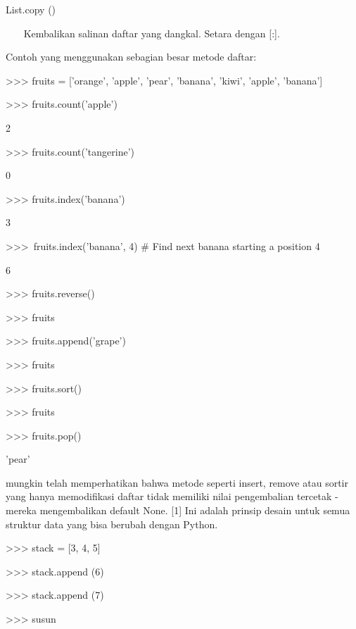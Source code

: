 \vspace{12pt}
List.copy () \par
\vspace{12pt}
~~~ Kembalikan salinan daftar yang dangkal. Setara dengan [:]. \par
\vspace{12pt}
Contoh yang menggunakan sebagian besar metode daftar: \par
\vspace{12pt}
>>> fruits = ['orange', 'apple', 'pear', 'banana', 'kiwi', 'apple', 'banana'] \par
>>> fruits.count('apple') \par
2 \par
>>> fruits.count('tangerine') \par
0 \par
>>> fruits.index('banana') \par
3 \par
>>>~fruits.index('banana', 4)   $  \#  $ Find next banana starting a position 4 \par
6 \par
>>> fruits.reverse() \par
>>> fruits \par
['banana', 'apple', 'kiwi', 'banana', 'pear', 'apple', 'orange'] \par
>>> fruits.append('grape') \par
>>> fruits \par
['banana', 'apple', 'kiwi', 'banana', 'pear', 'apple', 'orange', 'grape'] \par
>>> fruits.sort() \par
>>> fruits \par
['apple', 'apple', 'banana', 'banana', 'grape', 'kiwi', 'orange', 'pear'] \par
>>> fruits.pop() \par
'pear' \par
\vspace{12pt}
mungkin telah memperhatikan bahwa metode seperti insert, remove atau sortir yang hanya memodifikasi daftar tidak memiliki nilai pengembalian tercetak - mereka mengembalikan default None. [1] Ini adalah prinsip desain untuk semua struktur data yang bisa berubah dengan Python. \par
\vspace{12pt}
>>> stack = [3, 4, 5] \par
>>> stack.append (6) \par
>>> stack.append (7) \par
>>> susun \par
